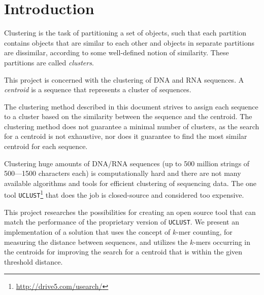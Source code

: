 \section{Introduction}


Clustering is the task of partitioning a set of objects, such that each
partition contains objects that are similar to each other and objects in
separate partitions are dissimilar, according to some well-defined notion of
similarity. These partitions are called \emph{clusters}.

This project is concerned with the clustering of DNA and RNA sequences. A
\emph{centroid} is a sequence that represents a cluster of sequences.

The clustering method described in this document strives to assign each
sequence to a cluster based on the similarity between the sequence and the
centroid. The clustering method does not guarantee a minimal number of
clusters, as the search for a centroid is not exhaustive, nor does it guarantee
to find the most similar centroid for each sequence.

Clustering huge amounts of DNA/RNA sequences (up to 500 million strings of
500—1500 characters each) is computationally hard and there are not many
available algorithms and tools for efficient clustering of sequencing data. The
one tool \texttt{UCLUST}\footnote{\url{http://drive5.com/usearch/}} that does
the job is closed-source and considered too expensive.

This project researches the possibilities for creating an open source tool that
can match the performance of the proprietary version of \texttt{UCLUST}. We
present an implementation of a solution that uses the concept of $k$-mer
counting, for measuring the distance between sequences, and utilizes the
$k$-mers occurring in the centroids for improving the search for a centroid that
is within the given threshold distance.
